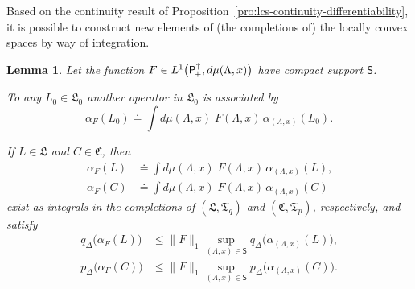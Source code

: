 \documentclass[a4paper,a4paper]{article}
\numberwithin{equation}{section}
\newcommand{\Cfrak}{\mathfrak{C}}
\newcommand{\Lfrak}{\mathfrak{L}}
\newcommand{\Tfrak}{\mathfrak{T}}
\newcommand{\Ssf}{\mathsf{S}}
\newcommand{\Poin}{\mathsf{P}_{\negthinspace +}^\uparrow}
\newcommand{\aLax}{\alpha_{( \Lambda , x )}}
\newcounter{propitem}
\newenvironment{proplist}{\begin{list}{(\roman{propitem})}%
  {\usecounter{propitem} \setlength{\topsep}{0ex}%
   \setlength{\parsep}{0.2ex} \setlength{\itemsep}{0.4ex}%
   \setlength{\leftmargin}{0em} \setlength{\itemindent}{0.5em}%
   }}{\end{list}}
\theoremstyle{definition}
\theoremstyle{plain}
\newtheorem{lemma}[definition]{Lemma}
\theoremstyle{remark}
\newcommand{\norm}[1]{\lVert #1 \rVert}
\newcommand{\bpDx}[1]{p_\Delta \bigl( #1 \bigr)}
\newcommand{\bqDx}[1]{q_\Delta \bigl( #1 \bigr)}
\begin{document}
  Based on the continuity result of
  Proposition~\ref{pro:lcs-continuity-differentiability}, it is
  possible to construct new elements of (the completions of) the
  locally convex spaces by way of integration.
  \begin{lemma}
    \label{lem:Poin-Bochner-integrals}
    Let the function $F \in L^1 \bigl( \Poin , d \mu ( \Lambda , x )
    \bigr)$ have compact support $\Ssf$.
    \begin{proplist}
    \item To any $L_0 \in \Lfrak_0$ another operator in $\Lfrak_0$ is
      associated by
      \begin{equation}
        \label{eq:L0-integral}
        \alpha_F ( L_0 ) \doteq \int d \mu ( \Lambda , x ) \; F (
        \Lambda , x ) \, \aLax ( L_0 ) \text{.}
      \end{equation}
    \item If $L \in \Lfrak$ and $C \in \Cfrak$, then
      \begin{subequations}
        \label{eq:LC-integral}
        \begin{align}
          \label{eq:L-integral}
          \alpha_F ( L ) & \doteq \int d \mu ( \Lambda , x ) \; F (
          \Lambda , x ) \, \aLax ( L ) \text{,} \\
          \label{eq:C-integral}
          \alpha_F ( C ) & \doteq \int d \mu ( \Lambda , x ) \; F (
          \Lambda , x ) \, \aLax ( C )
        \end{align}
      \end{subequations}
      exist as integrals in the completions of $( \Lfrak , \Tfrak_q )$
      and $( \Cfrak , \Tfrak_p )$, respectively, and satisfy
      \begin{subequations}
        \label{eq:LC-integral-estimate}
        \begin{align}
          \label{eq:L-integral-estimate}
          \bqDx{\alpha_F ( L )} & \leqslant \norm{F}_1 \sup_{( \Lambda
          , x ) \in \Ssf} \bqDx{\aLax ( L )} \text{,} \\
          \label{eq:C-integral-estimate}
          \bpDx{\alpha_F ( C )} & \leqslant \norm{F}_1 \sup_{( \Lambda
          , x ) \in \Ssf} \bpDx{\aLax ( C )} \text{.}
        \end{align}
      \end{subequations}
    \end{proplist}
  \end{lemma}
\end{document}
